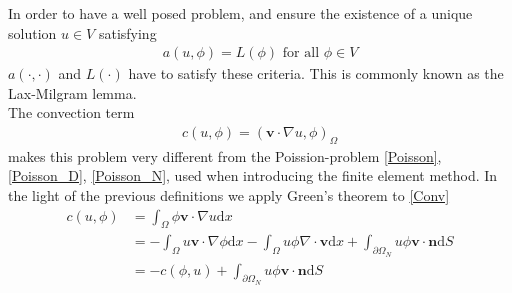 In order to have a well posed problem, and ensure the existence of a unique solution $u \in V$ satisfying
\begin{align}
a(u,\phi) = L(\phi) \text{ for all } \phi \in V
\end{align}
 $a(\cdot,\cdot)$ and $L(\cdot)$ have to satisfy these criteria. This is commonly known as the Lax-Milgram lemma.\\
The convection term
\begin{align}
c(u,\phi) = (\mathbf{v}\cdot \nabla u, \phi)_\Omega \label{Conv}
\end{align}
makes this problem very different from the Poission-problem \eqref{Poisson},\eqref{Poisson_D}, \eqref{Poisson_N}, used when introducing the finite element method. 
In the light of the previous definitions we apply Green's theorem to \eqref{Conv}
\begin{align}
c(u,\phi) & = \int_\Omega \phi\mathbf{v} \cdot \nabla u \mathrm{d}x \\
& = - \int_\Omega u \mathbf{v} \cdot \nabla \phi  \mathrm{d}x - \int_\Omega u \phi \nabla \cdot \mathbf{v} \mathrm{d}x  + \int_{\partial \Omega_N} u \phi \mathbf{v} \cdot \mathbf{n} \mathrm{d}S \\
& = - c(\phi,u) + \int_{\partial \Omega_N} u \phi \mathbf{v} \cdot \mathbf{n} \mathrm{d}S
\end{align}

